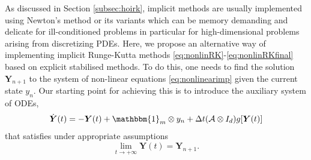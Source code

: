 \documentclass[10pt,a4paper]{article}
\newcommand{\R}{\mathbb{R}}
\newcommand{\bigo}{\mathcal{O}}
\def \calA{\mathcal{A}}
\renewcommand{\R}{\mathbb{R}}
\begin{document}
As discussed in Section \ref{subsec:hoirk}, implicit methods are usually implemented using Newton's method or its variants which can be memory demanding and delicate for ill-conditioned problems in particular for high-dimensional problems arising from discretizing PDEs.  Here, we propose an alternative way of implementing implicit Runge-Kutta methods 
\eqref{eq:nonlinRK}-\eqref{eq:nonlinRKfinal}
based on explicit stabilised methods. To do this, one needs to find the solution $\boldsymbol{Y}_{n+1}$ to the system of non-linear equations \eqref{eq:nonlinearimp}  given the current state $y_{n}$. Our starting point for achieving this is 
to introduce the auxiliary system of ODEs,
\begin{equation}\label{eq:gf1}
			\dot {\boldsymbol{Y}}(t)=-\boldsymbol{Y}(t)
	+\mathbbm{1}_m \otimes y_n
	+
	\Delta t (\calA \otimes I_d)
	g[\boldsymbol{Y}(t)]
\end{equation}  
that satisfies under appropriate assumptions 
\[
\lim_{t  \rightarrow +\infty} \boldsymbol{Y}(t) = \boldsymbol{Y}_{n+1}.
\]
\end{document}
